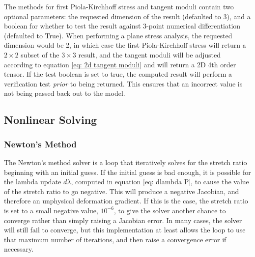 \documentclass[]{spie}  %
\begin{document}
The methods for first Piola-Kirchhoff stress and tangent moduli contain two optional parameters: the requested dimension of the result (defaulted to 3), and a boolean for whether to test the result against 3-point numerical differentiation (defaulted to True). When performing a plane stress analysis, the requested dimension would be 2, in which case the first Piola-Kirchhoff stress will return a $2 \times 2$ subset of the $3 \times 3$ result, and the tangent moduli will be adjusted according to equation \ref{eq: 2d tangent moduli} and will return a 2D 4th order tensor. If the test boolean is set to true, the computed result will perform a verification test \textit{prior} to being returned. This ensures that an incorrect value is not being passed back out to the model. 


\subsection{Nonlinear Solving}

\subsubsection{Newton's Method}
\label{sec: newton's method}
The Newton's method solver is a loop that iteratively solves for the stretch ratio beginning with an initial guess. If the initial guess is bad enough, it is possible for the lambda update $d\lambda$, computed in equation \ref{eq: dlambda P}, to cause the value of the stretch ratio to go negative. This will produce a negative Jacobian, and therefore an unphysical deformation gradient. If this is the case, the stretch ratio is set to a small negative value, $10^{-6}$, to give the solver another chance to converge rather than simply raising a Jacobian error. In many cases, the solver will still fail to converge, but this implementation at least allows the loop to use that maximum number of iterations, and then raise a convergence error if necessary. 
\end{document}
